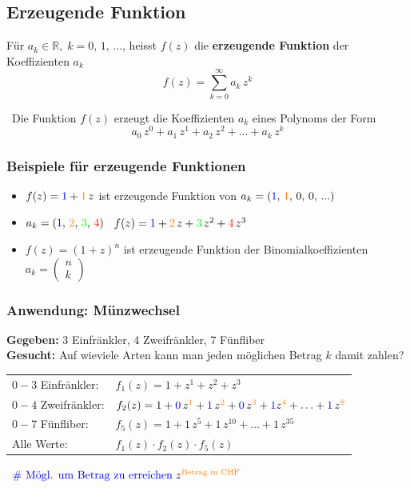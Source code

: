 \subsection{Erzeugende Funktion}

Für $a_k \in \mathbb{R}, \; k = 0, \, 1, \, ...$, heisst $f(z)$ die \textbf{erzeugende Funktion} der Koeffizienten $a_k$
$$ f(z) = \sum\limits_{k=0}^\infty a_k \, z^k $$

\textrightarrow\ Die Funktion $f(z)$ erzeugt die Koeffizienten $a_k$ eines Polynoms der Form
$$ a_0 \, z^0 + a_1 \, z^1 + a_2 \, z^2 + ... + a_k \, z^k $$ 


\subsubsection{Beispiele für erzeugende Funktionen}

\begin{itemize}
	\setlength\itemsep{0.75em}
	\item $f(z) = {\color{blue}1} + {\color{orange}1} \, z$ ist erzeugende Funktion von $a_k = ({\color{blue}1}, \, {\color{orange}1}, \,0, \,0, \, ...)$
	\item $a_k = ({\color{blue}1}, \, {\color{orange}2}, \, {\color{green}3}, \, {\color{red}4})$ \textrightarrow\  $f(z) = {\color{blue}1} + {\color{orange}2} \, z + {\color{green}3} \, z^2 + {\color{red}4} \, z^3$
	\item $f(z) = (1 + z)^n$ ist erzeugende Funktion der Binomialkoeffizienten $a_k = \begin{pmatrix} n\\k \end{pmatrix}$
\end{itemize}


\vfill\null
\columnbreak


\subsubsection*{Anwendung: Münzwechsel}

\textbf{Gegeben:} 3 Einfränkler, 4 Zweifränkler, 7 Fünfliber \\
\textbf{Gesucht:} Auf wieviele Arten kann man jeden möglichen Betrag $k$ damit zahlen?

\vspace{0.2cm}

\begin{tabular}{ll}
	$0-3$ Einfränkler:	& $f_1(z) = 1 + z^1 + z^2 + z^3$ \\	
	$0-4$ Zweifränkler: & $f_2(z) = 1 + {\color{blue}0} \, z^{{\color{orange}1}} + {\color{blue}1} \, z^{{\color{orange}2}} + {\color{blue}0} \, z^{{\color{orange}3}} + {\color{blue}1} z^{{\color{orange}4}} + \ldots + {\color{blue}1} \, z^{{\color{orange}8}}$ \\	
	$0-7$ Fünfliber: 	& $f_5(z) =  1 + 1 \, z^5 + 1 \, z^{10} + \ldots + 1 \, z^{35} $ \\	
	Alle Werte: 		& $f_1(z) \cdot f_2(z) \cdot f_5(z)$
\end{tabular}

\vspace{0.2cm}

\textrightarrow\ $\text{{\color{blue}{\# Mögl. um Betrag zu erreichen}}} \; z^{{\color{orange}\text{Betrag in CHF}} }$

